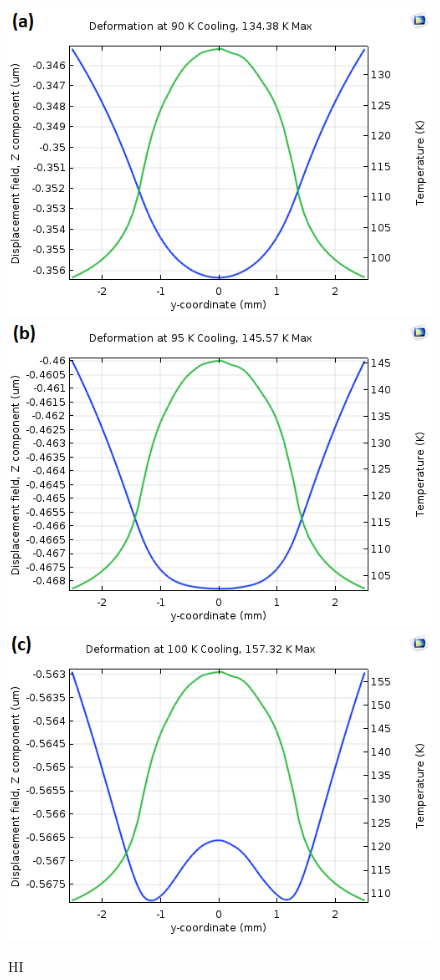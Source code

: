 \documentclass[preprint]{iucr}              %
\begin{document}
\begin{figure}
\caption{HI}
\includegraphics{images/90.png}
\includegraphics{images/95.png}
\includegraphics{images/100.png}

\end{figure}
\end{document}
